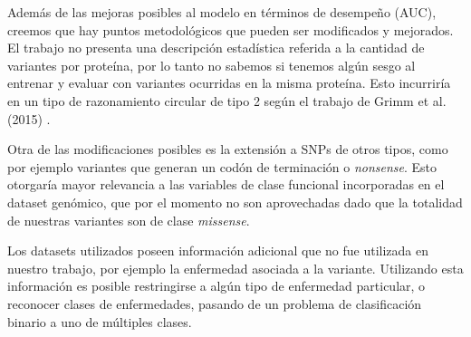 Además de las mejoras posibles al modelo en términos de desempeño (AUC), creemos que hay puntos metodológicos que pueden ser modificados y mejorados. El trabajo no presenta una descripción estadística referida a la cantidad de variantes por proteína, por lo tanto no sabemos si tenemos algún sesgo al entrenar y evaluar con variantes ocurridas en la misma proteína. Esto incurriría en un tipo de razonamiento circular de tipo 2 según el trabajo de Grimm et al. (2015) \cite{doi:10.1002/humu.22768}.  

Otra de las modificaciones posibles es la extensión a SNPs de otros tipos, como por ejemplo variantes que generan un codón de terminación o \textit{nonsense}. Esto otorgaría mayor relevancia a las variables de clase funcional incorporadas en el dataset genómico, que por el momento no son aprovechadas dado que la totalidad de nuestras variantes son de clase \textit{missense}.

Los datasets utilizados poseen información adicional que no fue utilizada en nuestro trabajo, por ejemplo la enfermedad asociada a la variante. Utilizando esta información es posible restringirse a algún tipo de enfermedad particular, o reconocer clases de enfermedades, pasando de un problema de clasificación binario a uno de múltiples clases. 



\newpage


